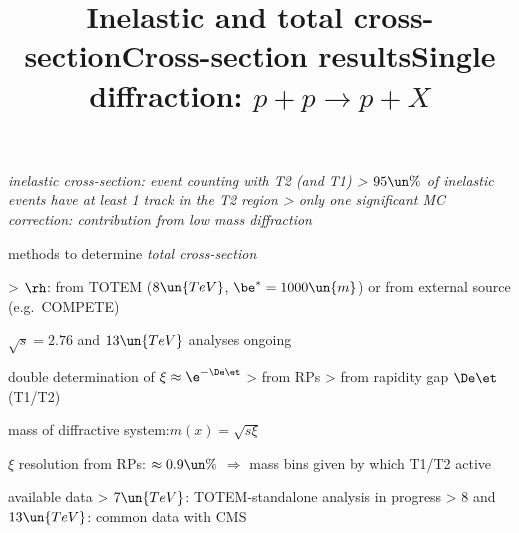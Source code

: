 \centerline{%
	\hskip1mm
}


\newpage %
\title{Inelastic and total cross-section}

\> \em{inelastic cross-section}: event counting with T2 (and T1)
\>> $95\un{\%}$ of inelastic events have at least 1 track in the T2 region
\>> only one significant MC correction: contribution from low mass diffraction

 methods to determine \em{total cross-section}

\centerline{}

\>> $\rh$: from TOTEM ($8\un{TeV}$, $\be^* = 1000\un{m}$) or from external source (e.g.~COMPETE)


\newpage %
\title{Cross-section results}

\centerline{%
	\hskip2mm
}

\> $\sqrt s = 2.76$ and $13\un{TeV}$ analyses ongoing


\newpage %
\title{Single diffraction: $p + p \rightarrow p + X$}

\centerline{}

\> double determination of $\xi \approx \e^{-\De\et}$
\>> from RPs
\>> from rapidity gap $\De\et$ (T1/T2)

\> mass of diffractive system:\cBlack $m(x) = \sqrt{s \xi}$ 

\> $\xi$ resolution from RPs: $\approx 0.9\un{\%}$ $\Rightarrow$ mass bins given by which T1/T2 active

\> available data
\>> $7\un{TeV}$: TOTEM-standalone analysis in progress
\>> $8$ and $13\un{TeV}$: common data with CMS

